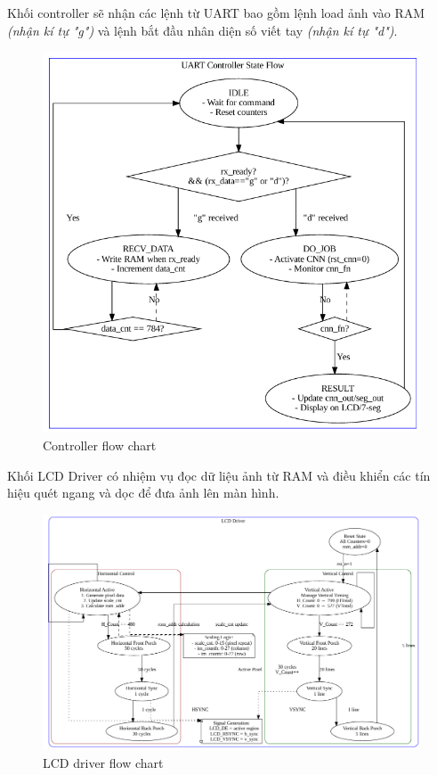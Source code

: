 Khối controller sẽ nhận các lệnh từ UART bao gồm lệnh load ảnh vào RAM \textit{(nhận kí tự "g")} và lệnh bắt đầu nhân diện số viết tay \textit{(nhận kí tự "d")}.
\begin{figure}[H]
    \centering
    \includegraphics[width=0.6\linewidth]{Images/controller_flow.png}
    \caption{Controller flow chart}
    \label{fig:enter-label}
\end{figure}

Khối LCD Driver có nhiệm vụ đọc dữ liệu ảnh từ RAM và điều khiển các tín hiệu quét ngang và dọc để đưa ảnh lên màn hình.
\begin{figure}[H]
    \centering
    \includegraphics[width=1\linewidth]{Images/lcdriver.png}
    \caption{LCD driver flow chart}
    \label{fig:enter-label}
\end{figure}

